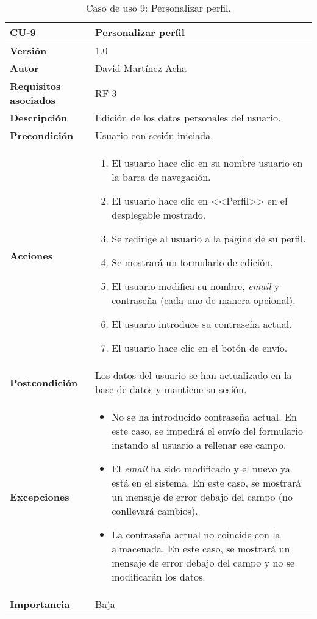 \begin{table}[p]
	\centering
	\begin{tabularx}{\linewidth}{ p{} p{} }
		\toprule
		\textbf{CU-9}    & \textbf{Personalizar perfil}\\
		\toprule
		\textbf{Versión}              & 1.0    \\
		\textbf{Autor}                & David Martínez Acha \\
		\textbf{Requisitos asociados} & RF-3 \\
		\textbf{Descripción}          & Edición de los datos personales del usuario. \\
		\textbf{Precondición}         & Usuario con sesión iniciada. \\
		\textbf{Acciones}             &
		\begin{enumerate}
			\def\labelenumi{\arabic{enumi}.}
			\tightlist
			\item El usuario hace clic en su nombre usuario en la barra de navegación.
			\item El usuario hace clic en <<Perfil>> en el desplegable mostrado.
			\item Se redirige al usuario a la página de su perfil.
			\item Se mostrará un formulario de edición.
			\item El usuario modifica su nombre, \textit{email} y contraseña (cada uno de manera opcional).
			\item El usuario introduce su contraseña actual.
			\item El usuario hace clic en el botón de envío.
		\end{enumerate}\\
		\textbf{Postcondición}        & Los datos del usuario se han actualizado en la base de datos y mantiene su sesión. \\
		\textbf{Excepciones}          & \begin{itemize}
			\item No se ha introducido contraseña actual. En este caso, se impedirá el envío del formulario instando al usuario a rellenar ese campo.
			\item El \emph{email} ha sido modificado y el nuevo ya está en el sistema. En este caso, se mostrará un mensaje de error debajo del campo (no conllevará cambios).
			\item La contraseña actual no coincide con la almacenada. En este caso, se mostrará un mensaje de error debajo del campo y no se modificarán los datos.
		\end{itemize}\\
		\textbf{Importancia}          & Baja \\
		\bottomrule
	\end{tabularx}
	\caption{Caso de uso 9: Personalizar perfil.}
\end{table}

